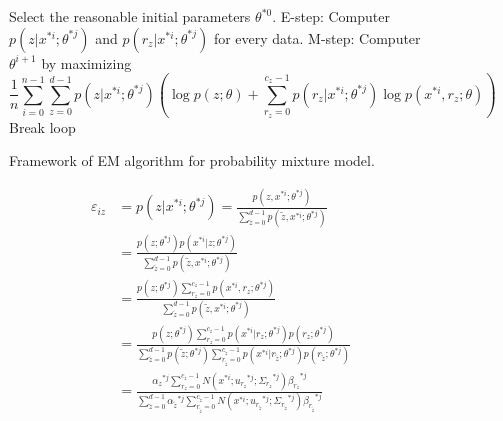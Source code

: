 \documentclass[runningheads,openany]{xhlPaper}
\begin{document}
\begin{figure}
\caption{Framework of EM algorithm for probability mixture model.}
\label{fig:pmmMixtureMixtureAlgorithm}
\begin{algorithmic}
\STATE Select the reasonable initial parameters $\theta ^{*0}$.
\LOOP 
\STATE E-step: Computer $p\left( {{z}|{x^{*i}};\theta ^{*j} } \right)$ and $p\left( {{r_z}|{x^{*i}};{\theta ^{*j}}} \right)$ for every data.
\STATE M-step: Computer $\theta ^{i + 1}$ by maximizing 
\begin{displaymath}
\frac{1}{n}\sum\limits_{i = 0}^{n - 1} {\sum\limits_{z = 0}^{d - 1} {p\left( {z|{x^{*i}};{\theta ^{*j}}} \right)\left( {\log p\left( {z;\theta } \right) + \sum\limits_{{r_z} = 0}^{{c_z} - 1} {p\left( {{r_z}|{x^{*i}};{\theta ^{*j}}} \right)\log p\left( {{x^{*i}},{r_z};\theta } \right)} } \right)} }
\end{displaymath}
\STATE Break loop
\ENDIF
\ENDLOOP
\end{algorithmic}
\end{figure}

\begin{equation}
\label{equ:pmmMixtureMixtureEpsilon}
\begin{aligned}
{\varepsilon _{iz}} &= p\left( {z|{x^{*i}};{\theta ^{*j}}} \right) = \frac{{p\left( {z,{x^{*i}};{\theta ^{*j}}} \right)}}{{\sum\limits_{\tilde z = 0}^{d - 1} {p\left( {\tilde z,{x^{*i}};{\theta ^{*j}}} \right)} }}\\
 &= \frac{{p\left( {z;{\theta ^{*j}}} \right)p\left( {{x^{*i}}|z;{\theta ^{*j}}} \right)}}{{\sum\limits_{\tilde z = 0}^{d - 1} {p\left( {\tilde z,{x^{*i}};{\theta ^{*j}}} \right)} }}\\
 &= \frac{{p\left( {z;{\theta ^{*j}}} \right)\sum\limits_{{r_z} = 0}^{{c_z} - 1} {p\left( {{x^{*i}},{r_z};{\theta ^{*j}}} \right)} }}{{\sum\limits_{\tilde z = 0}^{d - 1} {p\left( {\tilde z,{x^{*i}};{\theta ^{*j}}} \right)} }}\\
 &= \frac{{p\left( {z;{\theta ^{*j}}} \right)\sum\limits_{{r_z} = 0}^{{c_z} - 1} {p\left( {{x^{*i}}|{r_z};{\theta ^{*j}}} \right)p\left( {{r_z};{\theta ^{*j}}} \right)} }}{{\sum\limits_{\tilde z = 0}^{d - 1} {p\left( {\tilde z;{\theta ^{*j}}} \right)\sum\limits_{{r_{\tilde z}} = 0}^{{c_{\tilde z}} - 1} {p\left( {{x^{*i}}|{r_{\tilde z}};{\theta ^{*j}}} \right)p\left( {{r_{\tilde z}};{\theta ^{*j}}} \right)} } }}\\
 &= \frac{{{\alpha _z}^{*j}\sum\limits_{{r_z} = 0}^{{c_z} - 1} {N\left( {{x^{*i}};{u_{{r_z}}}^{*j};{\Sigma _{{r_z}}}^{*j}} \right){\beta _{{r_z}}}^{*j}} }}{{\sum\limits_{\tilde z = 0}^{d - 1} {{\alpha _{\tilde z}}^{*j}\sum\limits_{{r_{\tilde z}} = 0}^{{c_{\tilde z}} - 1} {N\left( {{x^{*i}};{u_{{r_{\tilde z}}}}^{*j};{\Sigma _{{r_{\tilde z}}}}^{*j}} \right){\beta _{{r_{\tilde z}}}}^{*j}} } }}
\end{aligned}
\end{equation}
\end{document}

